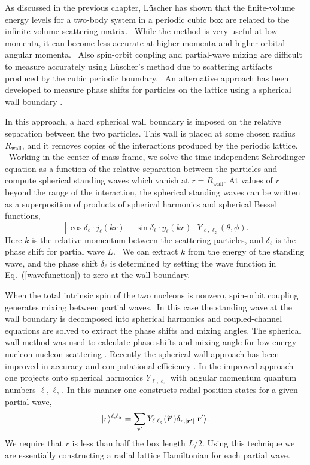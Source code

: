 As discussed in the previous chapter, L\"{u}scher \cite{Luscher:1985dn,Luscher:1986pf,Luscher:1991ux} has shown that the finite-volume energy levels for a two-body system in a periodic cubic box are related to the infinite-volume scattering matrix. \ While the method is very useful
at low momenta, it can become less accurate at higher momenta and higher orbital angular momenta. \ Also spin-orbit
coupling and partial-wave mixing are difficult to measure accurately using
L\"{u}scher's method due to scattering artifacts produced by the
cubic periodic boundary. \ An alternative approach has been developed to measure
phase shifts for particles on the lattice using a spherical wall boundary \cite{Borasoy:2007vy,Carlson:1984}.
\ 

In this approach, a hard spherical wall boundary is imposed on the relative separation between
the two particles.  This wall is placed at some chosen  radius $R_{\text{wall}}$, and it removes copies of the interactions produced by the periodic lattice.
\ Working in the center-of-mass frame, we solve the time-independent Schr{\"o}dinger equation as a function of the relative separation between the particles and compute spherical standing waves which vanish at $r=R_{\text{wall}}$.
At values of $r$ beyond the range of the interaction, the spherical standing
waves can be written as a superposition of products of spherical harmonics
and spherical Bessel functions,\begin{equation}
\left[  \cos\delta_{\ell}\cdot j_{\ell}(kr)-\sin\delta_{\ell}\cdot y_{\ell}(kr)\right]
Y_{\ell,\ell_{z}}(\theta,\phi). \label{wavefunction}%
\end{equation}
Here $k$ is the relative momentum between the scattering particles,
and $\delta_{\ell}$ is the phase shift for partial wave $L$. \ We can extract
$k$ from the energy of the standing wave, and the phase shift $\delta_{\ell}$
is determined by setting the wave function in Eq.~(\ref{wavefunction}) to
zero at the wall boundary.

When the total intrinsic spin of the two nucleons is nonzero,
spin-orbit coupling generates mixing between partial waves. $\ $In this case
the standing wave at the wall boundary is decomposed into spherical harmonics
and coupled-channel equations are solved to extract the phase shifts and
mixing angles.  The spherical wall method
was used to calculate phase shifts and mixing angle for low-energy nucleon-nucleon
scattering \cite{Borasoy:2007vi}.
Recently the spherical wall approach has been improved
in accuracy and computational efficiency \cite{Lu:2015riz}.
In the improved approach one projects onto spherical harmonics
$Y_{\ell,\ell_z}$ with angular momentum quantum numbers $\ell,\ell_z$.  In this manner one constructs radial position states for a given partial wave,
\begin{equation}
|r\rangle^{\ell,\ell_z} = \sum_{{\bf r'}}Y_{\ell,\ell_z}({\bf\hat{r}'})\delta_{r,|{\bf r'}|}|{\bf r'} \rangle.
\end{equation} We require that $r$ is less than half the box length $L/2$.
 Using this technique we are essentially constructing a radial lattice Hamiltonian for each partial wave. 

